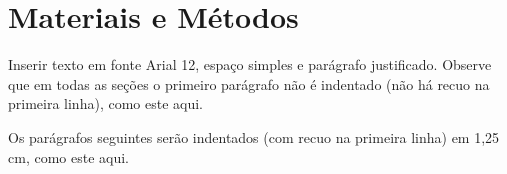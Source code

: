 \section{Materiais e Métodos}
Inserir texto em fonte Arial 12, espaço simples e parágrafo justificado. Observe que em todas as seções o primeiro parágrafo não é indentado (não há recuo na primeira linha), como este aqui.

Os parágrafos seguintes serão indentados (com recuo na primeira linha) em 1,25 cm, como este aqui.


